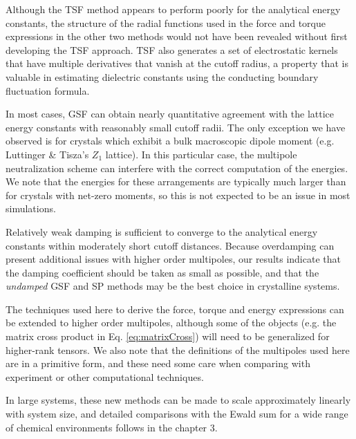 Although the TSF method appears to perform poorly for the analytical
energy constants, the structure of the radial functions used in the
force and torque expressions in the other two methods would not have
been revealed without first developing the TSF approach.  TSF also
generates a set of electrostatic kernels that have multiple
derivatives that vanish at the cutoff radius, a property that is
valuable in estimating dielectric constants using the conducting
boundary fluctuation formula.\cite{Izvekov08}

In most cases, GSF can obtain nearly quantitative agreement with the
lattice energy constants with reasonably small cutoff radii.  The only
exception we have observed is for crystals which exhibit a bulk
macroscopic dipole moment (e.g. Luttinger \& Tisza's $Z_1$ lattice).
In this particular case, the multipole neutralization scheme can
interfere with the correct computation of the energies.  We note that
the energies for these arrangements are typically much larger than for
crystals with net-zero moments, so this is not expected to be an issue
in most simulations.

Relatively weak damping is sufficient to converge to the analytical
energy constants within moderately short cutoff distances. Because
overdamping can present additional issues with higher order
multipoles, our results indicate that the damping coefficient should
be taken as small as possible, and that the {\it undamped} GSF and SP
methods may be the best choice in crystalline systems.

The techniques used here to derive the force, torque and energy
expressions can be extended to higher order multipoles, although some
of the objects (e.g. the matrix cross product in
Eq. \ref{eq:matrixCross}) will need to be generalized for higher-rank
tensors.  We also note that the definitions of the multipoles used
here are in a primitive form, and these need some care when comparing
with experiment or other computational techniques.

In large systems, these new methods can be made to scale approximately
linearly with system size, and detailed comparisons with the Ewald sum
for a wide range of chemical environments follows in the chapter 3.

%
%
%
%
%
% 
% 
